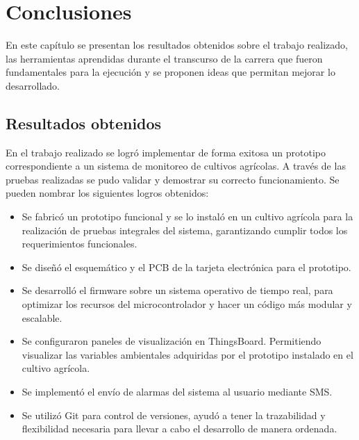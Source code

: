 
\chapter{Conclusiones} %
En este capítulo se presentan los resultados obtenidos sobre el trabajo realizado, las herramientas aprendidas durante el transcurso de la carrera que fueron fundamentales para la ejecución y se proponen ideas que permitan mejorar lo desarrollado.
\label{Chapter5} %

  


\section{Resultados obtenidos}
En el trabajo realizado se logró implementar de forma exitosa un prototipo correspondiente a un sistema de monitoreo de cultivos agrícolas. A través de las pruebas realizadas se pudo validar y demostrar su correcto funcionamiento.
Se pueden nombrar los siguientes logros obtenidos:
\begin{itemize}
\item Se fabricó un prototipo funcional y se lo instaló en un cultivo agrícola para la realización de pruebas integrales del sistema, garantizando cumplir todos los requerimientos funcionales.
\item Se diseñó el esquemático y el PCB de la tarjeta electrónica para el prototipo.
\item Se desarrolló el firmware sobre un sistema operativo de tiempo real, para optimizar los recursos del microcontrolador y hacer un código más modular y escalable.
\item Se configuraron paneles de visualización en ThingsBoard. Permitiendo visualizar las variables ambientales adquiridas por el prototipo instalado en el  cultivo agrícola.
\item Se implementó el envío de alarmas del sistema al usuario mediante SMS.
\item Se utilizó Git para control de versiones, ayudó a tener la trazabilidad y flexibilidad necesaria para llevar a cabo el desarrollo de manera ordenada.
\end{itemize}

